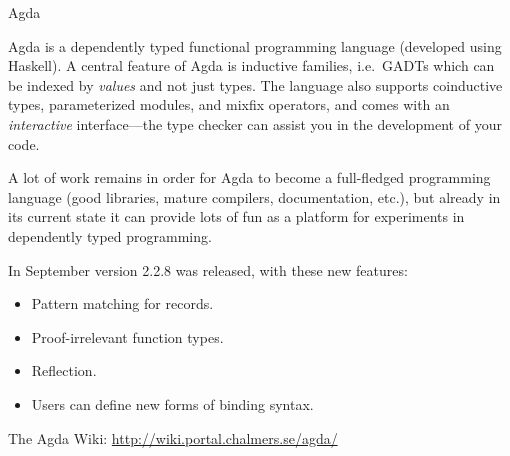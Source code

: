 \documentclass{article}
\begin{document}
\begin{hcarentry}[updated]{Agda}
\label{agda}
\makeheader

Agda is a dependently typed functional programming language (developed
using Haskell). A central feature of Agda is inductive families, i.e.\
GADTs which can be indexed by \emph{values} and not just types. The
language also supports coinductive types, parameterized modules, and
mixfix operators, and comes with an \emph{interactive} interface---the
type checker can assist you in the development of your code.

A lot of work remains in order for Agda to become a full-fledged
programming language (good libraries, mature compilers, documentation,
etc.), but already in its current state it can provide lots of fun as
a platform for experiments in dependently typed programming.

In September version 2.2.8 was released, with these new features:
\begin{itemize}
\item Pattern matching for records.
\item Proof-irrelevant function types.
\item Reflection.
\item Users can define new forms of binding syntax.
\end{itemize}

\FurtherReading
  The Agda Wiki: \url{http://wiki.portal.chalmers.se/agda/}
\end{hcarentry}
\end{document}
